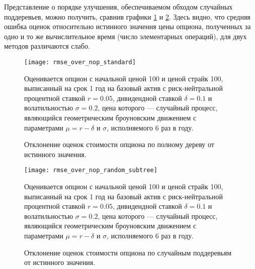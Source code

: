 Представление о порядке улучшения, обеспечиваемом обходом случайных поддеревьев, можно получить, сравнив графики \ref{fig:rmse_over_nop_standard} и \ref{fig:rmse_over_nop_random_subtree}. Здесь видно, что средняя ошибка оценок относительно истинного значения цены опциона, полученных за одно и то же вычислительное время (число элементарных операций), для двух методов различаются слабо. 
\begin{figure}%
    \centering
	\texttt{[image: rmse\_over\_nop\_standard]}
	\caption{Отклонение оценок стоимости опциона по полному дереву от истинного значения.}
	\label{fig:rmse_over_nop_standard}
	\footnotesize{Оценивается опцион с начальной ценой 100 и ценой страйк 100, выписанный на срок 1 год на базовый актив с риск-нейтральной процентной ставкой $r = 0.05$, дивидендной ставкой $\delta = 0.1$ и волатильностью $\sigma=0.2$, цена которого --- случайный процесс, являющийся геометрическим броуновским движением с параметрами $\mu = r - \delta$ и $\sigma$, исполняемого 6 раз в году.}
\end{figure}
\begin{figure}%
    \centering
	\texttt{[image: rmse\_over\_nop\_random\_subtree]}
	\caption{Отклонение оценок стоимости опциона по случайным поддеревьям от истинного значения.}
	\label{fig:rmse_over_nop_random_subtree}
	\footnotesize{Оценивается опцион с начальной ценой 100 и ценой страйк 100, выписанный на срок 1 год на базовый актив с риск-нейтральной процентной ставкой $r = 0.05$, дивидендной ставкой $\delta = 0.1$ и волатильностью $\sigma=0.2$, цена которого --- случайный процесс, являющийся геометрическим броуновским движением с параметрами $\mu = r - \delta$ и $\sigma$, исполняемого 6 раз в году.}
\end{figure}
